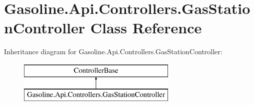 \hypertarget{class_gasoline_1_1_api_1_1_controllers_1_1_gas_station_controller}{}\section{Gasoline.\+Api.\+Controllers.\+Gas\+Station\+Controller Class Reference}
\label{class_gasoline_1_1_api_1_1_controllers_1_1_gas_station_controller}
Inheritance diagram for Gasoline.\+Api.\+Controllers.\+Gas\+Station\+Controller\+:\begin{figure}[H]
\begin{center}
\leavevmode
\includegraphics[height=2.000000cm]{class_gasoline_1_1_api_1_1_controllers_1_1_gas_station_controller}
\end{center}
\end{figure}
